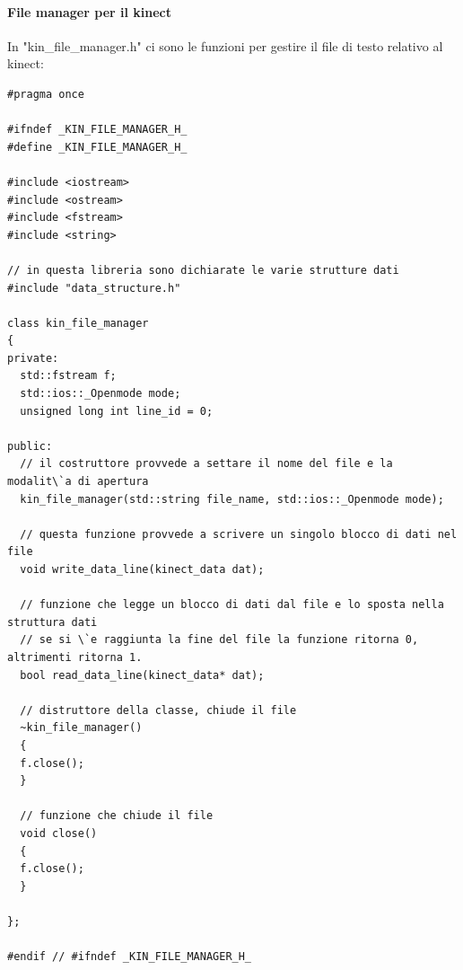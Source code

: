 \documentclass[10pt,a4paper]{article}
\begin{document}
\paragraph{File manager per il kinect}\label{par:kin_file_mng}
In "kin\_file\_manager.h" ci sono le funzioni per gestire il file di testo relativo al kinect:
\begin{lstlisting}[style=mycpp, caption=librerie usate, captionpos=b]
#pragma once

#ifndef _KIN_FILE_MANAGER_H_
#define _KIN_FILE_MANAGER_H_

#include <iostream>
#include <ostream>
#include <fstream>
#include <string>

// in questa libreria sono dichiarate le varie strutture dati
#include "data_structure.h"

class kin_file_manager
{
private:
  std::fstream f;
  std::ios::_Openmode mode;
  unsigned long int line_id = 0;

public:
  // il costruttore provvede a settare il nome del file e la modalit\`a di apertura
  kin_file_manager(std::string file_name, std::ios::_Openmode mode);

  // questa funzione provvede a scrivere un singolo blocco di dati nel file
  void write_data_line(kinect_data dat);

  // funzione che legge un blocco di dati dal file e lo sposta nella struttura dati
  // se si \`e raggiunta la fine del file la funzione ritorna 0, altrimenti ritorna 1. 
  bool read_data_line(kinect_data* dat);

  // distruttore della classe, chiude il file
  ~kin_file_manager()
  {
  f.close();
  }

  // funzione che chiude il file
  void close()
  {
  f.close();
  }

};

#endif // #ifndef _KIN_FILE_MANAGER_H_
\end{lstlisting}
%
%
\end{document}
